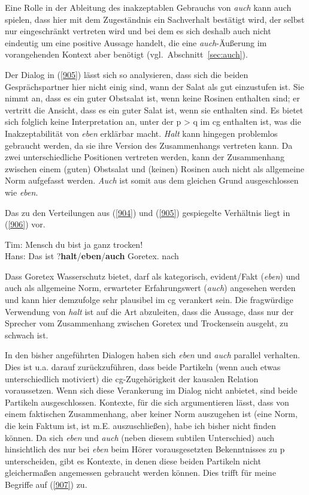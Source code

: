 {Eine Rolle in der Ableitung des inakzeptablen Gebrauchs von \textit{auch} kann auch spielen, dass hier mit dem Zugeständnis ein Sachverhalt bestätigt wird, der selbst nur eingeschränkt vertreten wird und bei dem es sich deshalb auch nicht eindeutig um eine positive Aussage handelt, die eine \textit{auch}-Äußerung im vorangehenden Kontext aber benötigt (vgl.\ Abschnitt~\ref{sec:auch}). 

Der Dialog in (\ref{905}) lässt sich so analysieren, dass sich die beiden Gesprächspartner hier nicht einig sind, wann der Salat als gut einzustufen ist. Sie nimmt an, dass es ein guter Obstsalat ist, wenn keine Rosinen enthalten sind; er vertritt die Ansicht, dass es ein guter Salat ist, wenn sie enthalten sind. Es bietet sich folglich keine Interpretation an, unter der p > q im cg enthalten ist, was die Inakzeptabilität von \textit{eben} erklärbar macht. \textit{Halt} kann hingegen problemlos gebraucht werden, da sie ihre Version des Zusammenhangs vertreten kann. Da zwei unterschiedliche Positionen vertreten werden, kann der Zusammenhang zwischen einem (guten) Obstsalat und (keinen) Rosinen auch nicht als allgemeine Norm aufgefasst werden. \textit{Auch} ist somit aus dem gleichen Grund ausgeschlossen wie \textit{eben}.

Das zu den Verteilungen aus (\ref{904}) und (\ref{905}) gespiegelte Verhältnis liegt in (\ref{906}) vor.

\begin{exe}
	\ex\label{906}
	Tim: Mensch du bist ja ganz trocken!\\
	Hans: Das ist ?\textbf{halt}/\textbf{eben}/\textbf{auch} Goretex.	
	\hfill\hbox{nach \citet[125]{Thurmair1989}}
\end{exe}
Dass Goretex Wasserschutz bietet, darf als kategorisch, evident/Fakt (\textit{eben}) und auch als allgemeine Norm, erwarteter Erfahrungswert (\textit{auch}) angesehen werden und kann hier demzufolge sehr plausibel im cg verankert sein. Die fragwürdige Verwendung von \textit{halt} ist auf die Art abzuleiten, dass die Aussage, dass nur der Sprecher vom Zusammenhang zwischen Goretex und Trockensein ausgeht, zu schwach ist.

In den bisher angeführten Dialogen haben sich \textit{eben} und \textit{auch} parallel verhalten. Dies ist u.a. darauf zurückzuführen, dass beide Partikeln (wenn auch etwas unterschiedlich motiviert) die cg-Zugehörigkeit der kausalen Relation voraussetzen. Wenn sich diese Verankerung im Dialog nicht anbietet, sind beide Partikeln ausgeschlossen. Kontexte, für die sich argumentieren lässt, dass von einem faktischen Zusammenhang, aber keiner Norm auszugehen ist (eine Norm, die kein Faktum ist, ist m.E. auszuschließen), habe ich bisher nicht finden können. Da sich \textit{eben} und \textit{auch} (neben diesem subtilen Unterschied) auch hinsichtlich des nur bei \textit{eben} beim Hörer vorausgesetzten Bekenntnisses zu p unterscheiden, gibt es Kontexte, in denen diese beiden Partikeln nicht gleichermaßen angemessen gebraucht werden können. Dies trifft für meine Begriffe auf (\ref{907}) zu.

}
